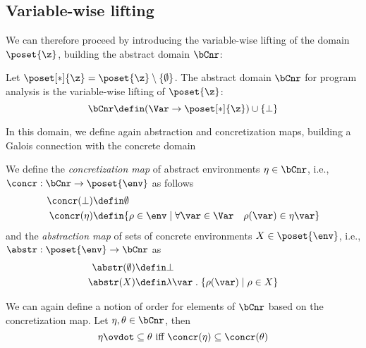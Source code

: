 \subsection{Variable-wise lifting}\label{sub:vwnonrel}

We can therefore proceed by introducing the variable-wise lifting of
the domain \(\poset{\z}\), building the abstract domain \(\bCnr\):

\begin{definition}
  Let \(\poset[*]{\z} = \poset{\z} \setminus \{\emptyset\}\). The
  abstract domain \(\bCnr\) for program analysis is the variable-wise
  lifting of \(\poset{\z}\):
  \[ \bCnr \defin (\Var \to \poset[*]{\z}) \cup \{ \bot \} \]
\end{definition}

In this domain, we define again abstraction and concretization maps,
building a Galois connection with the concrete domain

\begin{definition}\label{def:vwgalois}
  We define the \emph{concretization map} of abstract environments
  \(\eta \in \bCnr\), i.e., \({\concr : \bCnr \to \poset{\env}}\) as
  follows
  \begin{align*}
    \concr(\bot) & \defin \emptyset \\
    \concr(\eta) & \defin \{\rho \in \env \mid \forall \var \in \Var \quad \rho(\var) \in \eta\var\}
  \end{align*}
  and the \emph{abstraction map} of sets of concrete environments
  \(X \in \poset{\env}\), i.e., \(\abstr : \poset{\env} \to \bCnr\) as
  \begin{align*}
    \abstr(\emptyset) & \defin \bot \\
    \abstr(X) & \defin \lambda \var \; . \; \{\rho(\var) \mid \rho \in X\}
  \end{align*}
\end{definition}

We can again define a notion of order for elements of \(\bCnr\) based
on the concretization map. Let \(\eta, \theta \in \bCnr\), then
\begin{equation*}
  \eta \ovdot\subseteq \theta \text{ iff } \concr(\eta) \subseteq \concr(\theta)
\end{equation*}


